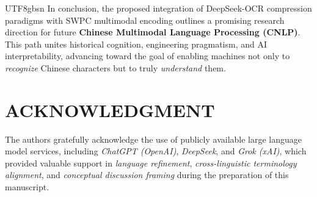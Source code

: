 \documentclass[conference]{IEEEtran}
\begin{document}
\begin{CJK*}{UTF8}{gbsn}
In conclusion, the proposed integration of DeepSeek-OCR compression paradigms with SWPC multimodal encoding outlines a promising research direction for future \textbf{Chinese Multimodal Language Processing (CNLP)}. This path unites historical cognition, engineering pragmatism, and AI interpretability, advancing toward the goal of enabling machines not only to \textit{recognize} Chinese characters but to truly \textit{understand} them.


\section*{ACKNOWLEDGMENT}
The authors gratefully acknowledge the use of publicly available large language model services, including \textit{ChatGPT (OpenAI)}, \textit{DeepSeek}, and \textit{Grok (xAI)}, which provided valuable support in \textit{language refinement}, \textit{cross-linguistic terminology alignment}, and \textit{conceptual discussion framing} during the preparation of this manuscript. 



\end{CJK*}
\end{document}
